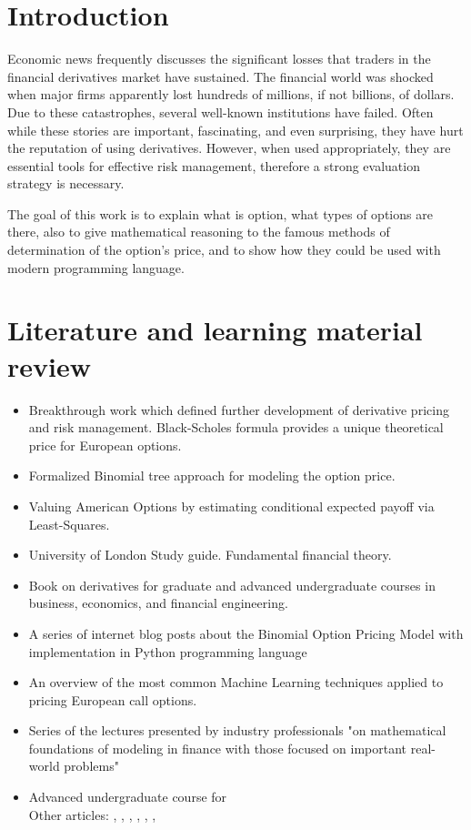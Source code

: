 \documentclass[11pt]{article}
\begin{document}
\section{Introduction}
\par Economic news frequently discusses the significant losses that traders in the financial derivatives market have sustained. The financial world was shocked when major firms apparently lost hundreds of millions, if not billions, of dollars. Due to these catastrophes, several well-known institutions have failed. Often while these stories are important, fascinating, and even surprising, they have hurt the reputation of using derivatives. However, when used appropriately, they are essential tools for effective risk management, therefore a strong evaluation strategy is necessary.
\par The goal of this work is to explain what is option, what types of options are there, also to give mathematical reasoning to the famous methods of determination of the option's price, and to show how they could be used with modern programming language.
\section{Literature and learning material review}
\begin{itemize}
    \item Breakthrough work which defined further development of derivative pricing and risk management. Black-Scholes formula provides a unique theoretical price for European options. \cite{B_S_73}
    \item Formalized Binomial tree approach for modeling the option price. \cite{C_R_R_79}
    \item Valuing American Options by estimating conditional expected payoff via Least-Squares. \cite{L_S_01}
    \item University of London Study guide. Fundamental financial theory. \cite{UoL}
    \item Book on derivatives for graduate and advanced undergraduate courses in business, economics, and financial engineering.  \cite{Hull_9}
    \item A series of internet blog posts about the Binomial Option Pricing Model with implementation in Python programming language \cite{JT_1, JT_2, JT_3, JT_4}
    \item An overview of the most common Machine Learning techniques applied to pricing European call options. \cite{C_21}
    \item Series of the lectures presented by industry professionals "on mathematical foundations of modeling in finance with those focused on important real-world problems" \cite{MIT}
    \item Advanced undergraduate course for \cite{ICEF_A} \\
Other articles: \cite{M_73}, \cite{M_76}, \cite{C_R_76}, \cite{B_76}, \cite{H_W_87}, \cite{B_C_C_97}, \cite{H_P_81}
\end{itemize}
\end{document}

